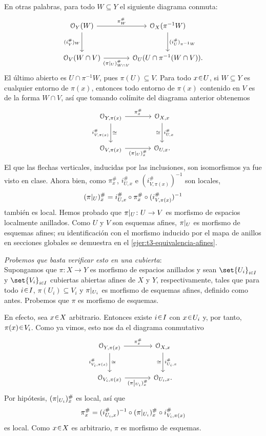 \begin{sol}
En otras palabras, para todo $W\subseteq Y$ el siguiente diagrama conmuta:
\[
\begin{tikzcd}[column sep=large,row sep=large]
\mathcal O_Y(W)\arrow[r,"\pi^\#_W"]\arrow[d,"(i_V^\#)_W"']
&\mathcal O_X(\pi^{-1}W)\arrow[d,"(i_U^\#)_{\pi^{-1}W}"]\\
\mathcal O_V(W\cap V)\arrow[r,"{(\restr{\pi}{U})^\#_{W\cap V}}"']
&\mathcal O_U(U\cap\pi^{-1}(W\cap V)).
\end{tikzcd}
\]
El último abierto es $U\cap\pi^{-1}W$, pues $\pi(U)\subseteq V$. Para todo $x\en U$, si $W\subseteq Y$ es cualquier entorno de $\pi(x)$, entonces todo entorno de $\pi(x)$ contenido en $V$ es de la forma $W\cap V$, así que tomando colímite del diagrama anterior obtenemos
\begin{equation}\label{eq:t3-tallos-restriccion}
\begin{tikzcd}[column sep=large,row sep=large]
\mathcal O_{Y,\pi(x)}\arrow[r,"\pi_x^\#"]\arrow[d,"i^\#_{V,\pi(x)}"',"\cong"]
&\mathcal O_{X,x}\arrow[d,"i^\#_{U,x}","\cong"']\\
\mathcal O_{V,\pi(x)}\arrow[r,"{(\restr{\pi}{U})_x^\#}"']&\mathcal O_{U,x}.
\end{tikzcd}
\end{equation}
El que las flechas verticales, inducidas por las inclusiones, son isomorfismos ya fue visto en clase. Ahora bien, como $\pi_x^\#$, $i^\#_{U,x}$ e $(i^\#_{V,\pi(x)})^{-1}$ son locales,
\[
(\restr{\pi}{U})_x^\#=i^\#_{U,x}\circ\pi_x^\#\circ(i^\#_{V,\pi(x)})^{-1}
\]
también es local. Hemos probado que $\restr{\pi}{U}\colon U\to V$ es morfismo de espacios localmente anillados. Como $U$ y $V$ son esquemas afines, $\restr{\pi}{U}$ es morfismo de esquemas afines; su identificación con el morfismo inducido por el mapa de anillos en secciones globales se demuestra en el \cref{ejer:t3-equivalencia-afines}.

\medskip
\noindent\emph{Probemos que basta verificar esto en una cubierta}:\\
Supongamos que $\pi\colon X\to Y$ es morfismo de espacios anillados y sean $\set{U_i}_{i\en I}$ y $\set{V_i}_{i\en I}$ cubiertas abiertas afines de $X$ y $Y$, respectivamente, tales que para todo $i\en I$, $\pi(U_i)\subseteq V_i$ y $\restr{\pi}{U_i}$ es morfismo de esquemas afines, definido como antes. Probemos que $\pi$ es morfismo de esquemas.

En efecto, sea $x\en X$ arbitrario. Entonces existe $i\en I$ con $x\en U_i$ y, por tanto, $\pi(x)\en V_i$. Como ya vimos, esto nos da el diagrama conmutativo
\[
\begin{tikzcd}[column sep=large,row sep=large]
\mathcal O_{Y,\pi(x)}\arrow[r,"\pi_x^\#"]\arrow[d,"i^\#_{V_i,\pi(x)}"',"\cong"]
&\mathcal O_{X,x}\arrow[d,"i^\#_{U_i,x}","\cong"']\\
\mathcal O_{V_i,\pi(x)}\arrow[r,"{(\restr{\pi}{U_i})_x^\#}"']&\mathcal O_{U_i,x}.
\end{tikzcd}
\]
Por hipótesis, $(\restr{\pi}{U_i})_x^\#$ es local, así que
\[
\pi_x^\#=(i^\#_{U_i,x})^{-1}\circ(\restr{\pi}{U_i})_x^\#\circ i^\#_{V_i,\pi(x)}
\]
es local. Como $x\en X$ es arbitrario, $\pi$ es morfismo de esquemas.
\end{sol}
